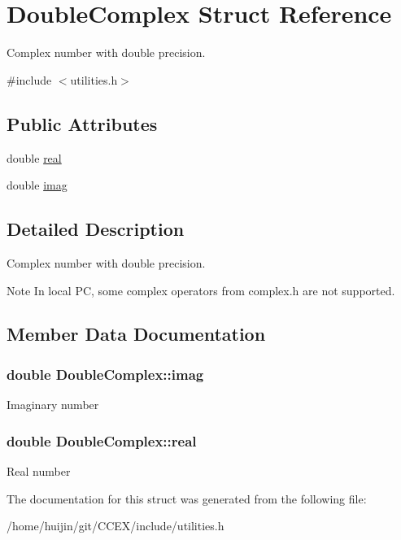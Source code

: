 \hypertarget{structDoubleComplex}{\section{Double\-Complex Struct Reference}
\label{structDoubleComplex}
}


Complex number with double precision.  




{\ttfamily \#include $<$utilities.\-h$>$}

\subsection*{Public Attributes}
\begin{DoxyCompactItemize}
\item 
double \hyperlink{structDoubleComplex_a59acbb424a325b3510f85b75642bc5e4}{real}
\item 
double \hyperlink{structDoubleComplex_aa3fa36b7221c819a1ee1f642529b5529}{imag}
\end{DoxyCompactItemize}


\subsection{Detailed Description}
Complex number with double precision. 





\begin{DoxyNote}{Note}
In local P\-C, some complex operators from complex.\-h are not supported. 
\end{DoxyNote}


\subsection{Member Data Documentation}
\hypertarget{structDoubleComplex_aa3fa36b7221c819a1ee1f642529b5529}{
\subsubsection[{imag}]{\setlength{\rightskip}{0pt plus 5cm}double Double\-Complex\-::imag}}\label{structDoubleComplex_aa3fa36b7221c819a1ee1f642529b5529}
Imaginary number \hypertarget{structDoubleComplex_a59acbb424a325b3510f85b75642bc5e4}{
\subsubsection[{real}]{\setlength{\rightskip}{0pt plus 5cm}double Double\-Complex\-::real}}\label{structDoubleComplex_a59acbb424a325b3510f85b75642bc5e4}
Real number 

The documentation for this struct was generated from the following file\-:\begin{DoxyCompactItemize}
\item 
/home/huijin/git/\-C\-C\-E\-X/include/utilities.\-h\end{DoxyCompactItemize}

